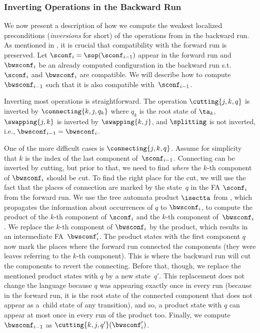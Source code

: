 \subsubsection*{Inverting Operations in the Backward Run}\label{sec:bwd_run}

We now present a description of how we compute the weakest localized preconditions
(\emph{inversions} for short) of the operations from  in the backward run.
As mentioned in , 
it is crucial that compatibility with the forward run is preserved. 
Let $\sconf_i = \sop(\sconf_{i-1})$ appear in the forward run and
$\bwsconf_{i}$ be an already computed configuration in the backward run
s.t.~$\sconf_i$ and $\bwsconf_i$ are compatible.
We will describe how to compute $\bwsconf_{i-1}$ such that it is also
compatible with~$\sconf_{i-1}$.

Inverting most operations is straightforward.
The operation $\cutting{j,k,q}$ is inverted by $\connecting{k,j,q_k}$ where $q_k$ is the root state of $\ta_k$,
$\swapping{j,k}$ is inverted by $\swapping{k,j}$, and $\splitting$ is not inverted, i.e., $\bwsconf_{i-1} = \bwsconf_i$.

One of the more difficult cases is 
$\connecting{j,k,q}$. %
Assume for simplicity that $k$ is the index of the last component of~$\sconf_{i-1}$.
%
Connecting can be inverted by cutting, but prior to that, we need to find
\emph{where} the $k$-th component of $\bwsconf_i$ should be cut.
To find the right place for the cut, we will
use the fact that the places of connection are marked by the
state~$q$ in the FA $\sconf_i$ from the forward run.
%
We use the tree automata product $\isectta$ from
, which
propagates the information about occurrences of $q$ to $\bwsconf_{i}$,
to compute the product of the $k$-th
component of $\sconf_{i}$ and the $k$-th component of~$\bwsconf_i$.
%
We replace the $k$-th component of $\bwsconf_i$ by the product, 
which results in an intermediate FA~$\bwsconf_i'$.
%
The product states with the first component $q$ now mark the places where the forward run connected the components (they were leaves referring to the $k$-th component).
%
This is where the backward run will cut the components to revert the connecting. 
%
Before that, though, we replace the mentioned product states with $q$ by a new state~$q'$.
This replacement does not change the language because $q$ was appearing
exactly once in every run (because in the forward run, it is the root state of
the connected component that does not appear as a~child state of any transition), and so, 
a product state with $q$ can appear at most once in
every run of the product too.
%
Finally, we compute $\bwsconf_{i-1}$ as $\cutting{k,j,q'}(\bwsconf_i')$.

